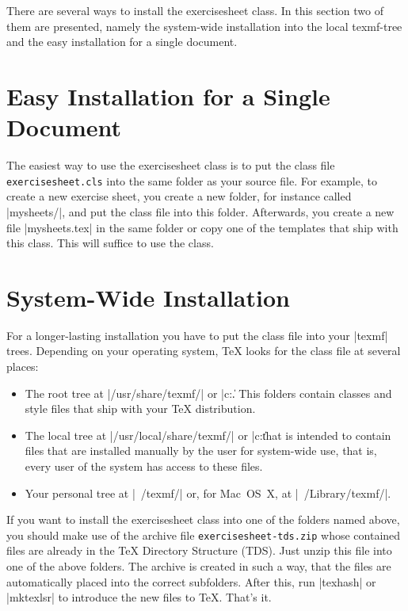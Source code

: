 \documentclass[a4paper,fleqn]{report}
\def\exercisesheet{{exercisesheet}}
\begin{document}
There are several ways to install the \exercisesheet{} class. In this
section two of them are presented, namely the system-wide installation
into the local texmf-tree and the easy installation for a single
document.


\section{Easy Installation for a Single Document}

The easiest way to use the \exercisesheet{} class is to put the class
file \lstinline[language=bash]|exercisesheet.cls| into the same folder
as your source file. For example, to create a new exercise sheet, you
create a new folder, for instance called |mysheets/|, and put the
class file into this folder.  Afterwards, you create a new file
|mysheets.tex| in the same folder or copy one of the templates that
ship with this class. This will suffice to use the class.


\section{System-Wide Installation}

For a longer-lasting installation you have to put the class file into
your |texmf| trees. Depending on your operating system, \TeX{} looks
for the class file at several places:
\begin{itemize}
  \item The root tree at |/usr/share/texmf/| or |c:\texmf\|. This
    folders contain classes and style files that ship with your \TeX{}
    distribution.
  \item The local tree at |/usr/local/share/texmf/| or
    |c:\localtexmf\| that is intended to contain files that are
    installed manually by the user for system-wide use, that is, every
    user of the system has access to these files.
  \item Your personal tree at |~/texmf/| or, for Mac~OS~X, at
    |~/Library/texmf/|.
\end{itemize}
If you want to install the \exercisesheet{} class into one of the
folders named above, you should make use of the archive file
\lstinline[language=bash]{exercisesheet-tds.zip} whose contained
files are already in the \TeX{} Directory Structure (TDS). Just unzip
this file into one of the above folders. The archive is created in
such a way, that the files are automatically placed into the correct
subfolders. After this, run |texhash| or |mktexlsr| to introduce the
new files to \TeX. That's it.
\end{document}
